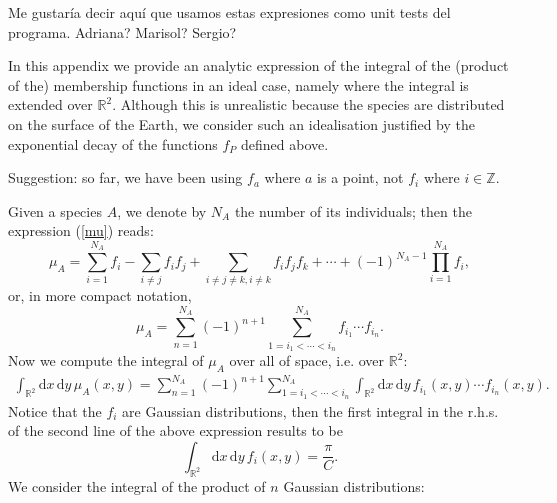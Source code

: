 \documentclass[12pt]{article}
\newcommand{\xd}{\mathrm{d}}
\numberwithin{equation}{section} %
\numberwithin{figure}{section} %
\def\ZZ{{\mathbb{Z}}}
\theoremstyle{definition}
\def\tcr#1{\textcolor{MyRed}{#1}}
\begin{document}
\tcr{Me gustaría decir aquí que usamos estas expresiones como unit tests del programa. Adriana? Marisol? Sergio?}

In this appendix we provide an analytic expression of the integral of the (product of the) membership functions in an ideal case, namely where the integral is extended over ${\mathbb R}^2$. Although this is unrealistic because the species are distributed on the surface of the Earth, we consider such an idealisation justified by the exponential decay of the functions $f_P$ defined above.

\tcr{Suggestion: so far, we have been using $f_a$ where $a$ is a point, not $f_i$ where $i\in\ZZ$.}

Given a species $A$, we denote by $N_A$ the number of its individuals; then the expression (\ref{mu}) reads:
\begin{equation}
\mu_A = \sum_{i=1}^{N_A} f_{i} - \sum_{i \neq j} f_{i} f_{j} + \sum_{i \neq j \neq k,  i \neq k } f_{i} f_{j} f_{k} + \cdots + (-1)^{N_A-1} \prod_{i=1}^{N_A} f_i,
\end{equation}
or, in more compact notation,
\begin{equation}
\mu_A = \sum_{n=1}^{N_A} (-1)^{n+1} \sum_{ 1=i_1< \cdots <i_n }^{N_A} f_{i_1} \cdots f_{i_n}.
\end{equation}
Now we compute the integral of $\mu_A$ over all of space, i.e. over ${\mathbb R}^2$:
\begin{align}
\int_{{\mathbb R}^2} \xd x \, \xd y \, \mu_A(x,y)
= \sum_{n=1}^{N_A} (-1)^{n+1} \sum_{ 1=i_1< \cdots <i_n }^{N_A} \int_{{\mathbb R}^2} \xd x \, \xd y \,  f_{i_1} (x,y)\cdots f_{i_n} (x,y).
\end{align}
Notice that the $f_i$ are Gaussian distributions, then the first integral in the r.h.s. of the second line of the above expression results to be
\begin{equation}
\int_{{\mathbb R}^2} \xd x \, \xd y \, f_{i}(x,y) = \frac{\pi}{C}.
\end{equation}
We consider the integral of the product of $n$ Gaussian distributions:
\end{document}
